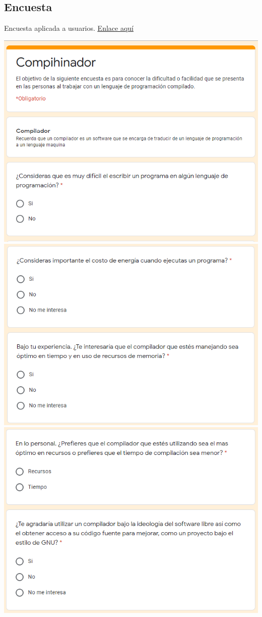 \documentclass[10pt,executivepaper]{article}
\begin{document}
\subsection{Encuesta}
Encuesta aplicada a usuarios. \href{https://forms.gle/8S5iEbKtkk9fVoKZ8}{{\underline{Enlace aquí}}}
\begin{center}
\includegraphics[scale=0.5]{imgs/Encuesta1.png}
\includegraphics[scale=0.5]{imgs/Encuesta2.png}
\includegraphics[scale=0.5]{imgs/Encuesta3.png}

\end{center}
\end{document}
